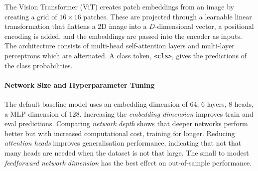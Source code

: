 The Vision Transformer (ViT) \citep{dosovitskiy2020vit} creates patch embeddings from an image
by creating a grid of $16 \times 16$ patches.
These are projected through a learnable linear transformation that flattens a 2D image into a $D$-dimensional vector,
a positional encoding is added,
and the embeddings are passed into the encoder as inputs.
The architecture consists of multi-head self-attention layers and multi-layer perceptrons which are alternated.
A class token, \texttt{<cls>}, gives the predictions of the class probabilities. \citep{prince2023understanding,ye2022geometry}

\paragraph{Network Size and Hyperparameter Tuning}

The default baseline model \citep{Goodfellowetal2016} uses an embedding dimension of 64, 6 layers, 8 heads, a MLP dimension of 128.
Increasing the \textit{embedding dimension} improves train and eval predictions.
Comparing \textit{network depth} shows that deeper networks perform better but with increased computational cost, training for longer.
Reducing \textit{attention heads} improves generalisation performance, indicating that not that many heads are needed when the dataset is not that large.
The small to modest \textit{feedforward network dimension} has the best effect on out-of-sample performance.

